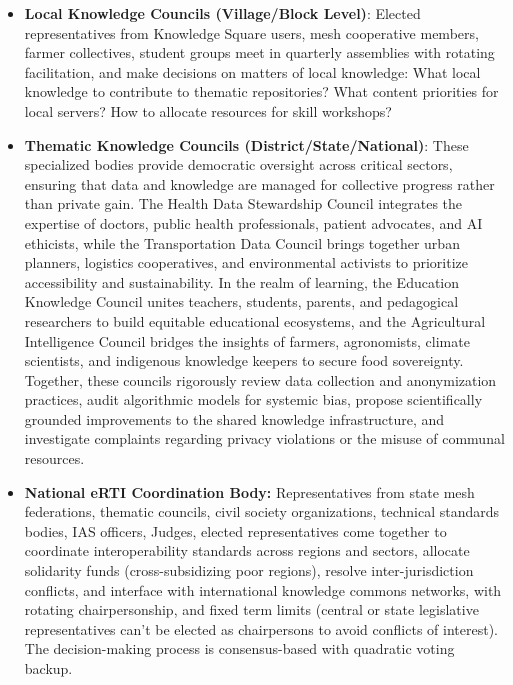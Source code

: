 \begin{itemize}
\item
  \textbf{Local Knowledge Councils (Village/Block Level)}: Elected
  representatives from Knowledge Square users, mesh cooperative members,
  farmer collectives, student groups meet in quarterly assemblies with
  rotating facilitation, and make decisions on matters of local
  knowledge: What local knowledge to contribute to thematic
  repositories? What content priorities for local servers? How to
  allocate resources for skill workshops?
\item
  \textbf{Thematic Knowledge Councils (District/State/National)}: These
  specialized bodies provide democratic oversight across critical
  sectors, ensuring that data and knowledge are managed for collective
  progress rather than private gain. The Health Data Stewardship Council
  integrates the expertise of doctors, public health professionals,
  patient advocates, and AI ethicists, while the Transportation Data
  Council brings together urban planners, logistics cooperatives, and
  environmental activists to prioritize accessibility and
  sustainability. In the realm of learning, the Education Knowledge
  Council unites teachers, students, parents, and pedagogical
  researchers to build equitable educational ecosystems, and the
  Agricultural Intelligence Council bridges the insights of farmers,
  agronomists, climate scientists, and indigenous knowledge keepers to
  secure food sovereignty. Together, these councils rigorously review
  data collection and anonymization practices, audit algorithmic models
  for systemic bias, propose scientifically grounded improvements to the
  shared knowledge infrastructure, and investigate complaints regarding
  privacy violations or the misuse of communal resources.
\item
  \textbf{National eRTI Coordination Body:} Representatives from state
  mesh federations, thematic councils, civil society organizations,
  technical standards bodies, IAS officers, Judges, elected
  representatives come together to coordinate interoperability standards
  across regions and sectors, allocate solidarity funds
  (cross-subsidizing poor regions), resolve inter-jurisdiction
  conflicts, and interface with international knowledge commons
  networks, with rotating chairpersonship, and fixed term limits
  (central or state legislative representatives can't be elected as
  chairpersons to avoid conflicts of interest). The decision-making
  process is consensus-based with quadratic voting backup.
\end{itemize}

